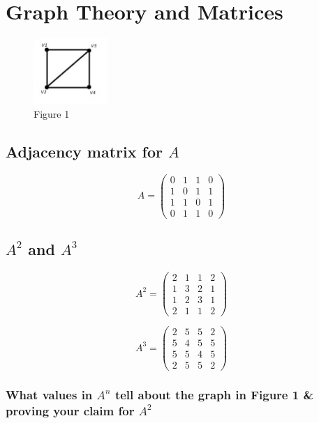 \documentclass[12pt]{scrreprt}
\begin{document}
\tableofcontents 

\chapter{Graph Theory and Matrices} 

\begin{figure}[h]
	
	\centering
		\includegraphics[width=0.25\textwidth]{figure1}
	\caption{Figure 1}

\end{figure}

\section{Adjacency matrix for $A$} 

\[ A = \left( \begin{array}{cccc}
0 & 1 & 1 & 0 \\
1 & 0 & 1 & 1 \\
1 & 1 & 0 & 1 \\
0 & 1 & 1 & 0 \end{array} \right)\] 

\section{$A^2$ and $A^3$}

\[ A^2 = \left( \begin{array}{cccc}
2 & 1 & 1 & 2 \\
1 & 3 & 2 & 1 \\
1 & 2 & 3 & 1 \\
2 & 1 & 1 & 2 \end{array} \right)\] 

\[ A^3 = \left( \begin{array}{cccc}
2 & 5 & 5 & 2 \\
5 & 4 & 5 & 5 \\
5 & 5 & 4 & 5 \\
2 & 5 & 5 & 2 \end{array} \right)\] 

\pagebreak

\subsection{What values in $A^n$ tell about the graph in Figure 1 & proving your claim for $A^2$} 
\end{document}
